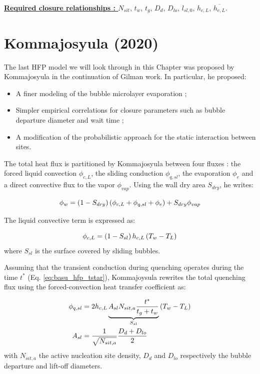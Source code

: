 \npar

\textbf{\underline{Required closure relationships : }} $N_{sit}$, $t_{w}$, $t_{g}$, $D_{d}$, $D_{lo}$, $l_{sl,0}$, $h_{c,L}$, $\overline{h_{c,L}}$. 



\section{Kommajosyula (2020)}
\label{sec:hfp_komma}

The last HFP model we will look through in this Chapter was proposed by Kommajosyula \cite{kommajosyula_development_2020} in the continuation of Gilman \cite{gilman_development_2014} work. In particular, he proposed:

\begin{itemize}
\item A finer modeling of the bubble microlayer evaporation ;
\item Simpler empirical correlations for closure parameters such as bubble departure diameter and wait time ;
\item A modification of the probabilistic approach for the static interaction between sites.
\end{itemize}

The total heat flux is partitioned by Kommajosyula between four fluxes : the forced liquid convection $\phi_{c,L}$, the sliding conduction $\phi_{q,sl}$, the evaporation $\phi_{e}$ and a direct convective flux to the vapor $\phi_{vap}$. Using the wall dry area $S_{dry}$, he writes:

\begin{equation}
\phi_{w} = \left( 1-S_{dry} \right)\left( \phi_{c,L} + \phi_{q,sl} + \phi_{e} \right) + S_{dry} \phi_{vap}
\end{equation}

The liquid convective term is expressed as:

\begin{equation}
\phi_{c,L} = \left( 1-S_{sl} \right)h_{c,L}\left( T_{w} - T_{L} \right)
\end{equation}
where $S_{sl}$ is the surface covered by sliding bubbles.

\npar

Assuming that the transient conduction during quenching operates during the time $t^{*}$ (Eq. \ref{eq:basu_hfp_tstar}), Kommajoysula rewrites the total quenching flux using the forced-convection heat transfer coefficient as:

\begin{align}
\phi_{q,sl} &= 2 h_{c,L} \underbrace{ A_{sl} N_{sit,a} \frac{t^{*}}{t_{g}+t_{w}} }_{S_{sl}} \left( T_{w}-T_{L} \right)\\
A_{sl} &= \dfrac{1}{\sqrt{N_{sit,a}}} \frac{D_{d} + D_{lo}}{2}
\label{eq:komma_phiq}
\end{align}
with $N_{sit,a}$ the active nucleation site density, $D_{d}$ and $D_{lo}$ respectively the bubble departure and lift-off diameters.

